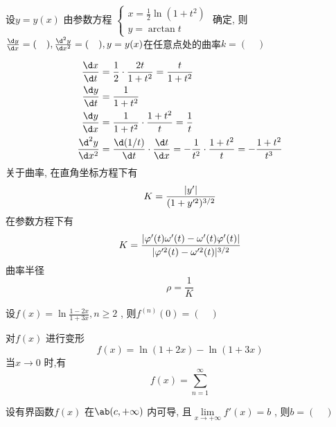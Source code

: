 \begin{question}
    设$ y = y(x) $ 由参数方程  $ 
    \begin{cases}
         x = \frac 1 2 \ln(1 + t^2)      \\
         y = \arctan t  
    \end{cases} $ 
    确定, 则$ \frac{\d y}{\d x} = (\quad) , \frac{\d^2 y}{\d x^2} = (\quad) , y = y(x) $在任意点处的曲率$ k = (\quad) $  
\end{question}
\begin{solution}
    \begin{align*}
        \frac{\d x}{\d t} &= \frac{1}{2} \cdot \frac{2t}{1 + t^2} = \frac{t}{1 + t^2}  \\  
        \frac{\d y}{\d t} &= \frac{1}{1 + t^2}  \\
        \frac{\d y}{\d x} &= \frac{1}{1 + t^2} \cdot \frac{1 + t^2}{t} = \frac{1}{t} \\
        \frac{\d^2 y}{\d x^2} &= \frac{\d (1 / t)}{\d t} \cdot \frac{\d t}{\d x} = -\frac{1}{t^2} \cdot \frac{1 + t^2}{t} = -\frac{1 + t^2}{t^3}
    \end{align*}
    关于曲率, 在直角坐标方程下有
    \begin{equation*}
        K = \frac{\lvert y'\rvert}{(1 + y'^2)^{3 / 2}}
    \end{equation*}
    在参数方程下有
    \begin{equation*}
        K = \frac{\lvert \varphi'(t)\omega'(t) - \omega'(t) \varphi'(t)\rvert}{\lvert \varphi'^2(t) - \omega'^2(t) \rvert^{3/2}}
    \end{equation*}
    曲率半径
    \begin{equation*}
        \rho = \frac{1}{K}
    \end{equation*}
\end{solution}
\begin{question}
    设$ f(x) = \ln \frac{1 - 2x}{1 + 3x}, n \ge 2 $ , 则$ f^{(n)} (0) = (\quad) $ 
\end{question}
\begin{solution}
    对$ f(x) $ 进行变形
    \begin{equation*}
        f(x) = \ln (1 + 2x) - \ln (1 + 3x)
    \end{equation*}
    当$ x \to 0 $ 时,有
    \begin{equation*}
        f(x) = \sum_{n = 1}^{\infty}
    \end{equation*}
\end{solution}
\begin{question}
    设有界函数$ f(x) $ 在$ \ab(c, +\infty) $ 内可导, 且$ \lim\limits_{x \to +\infty} f'(x) = b $ , 则$ b = (\quad) $ 
\end{question}
